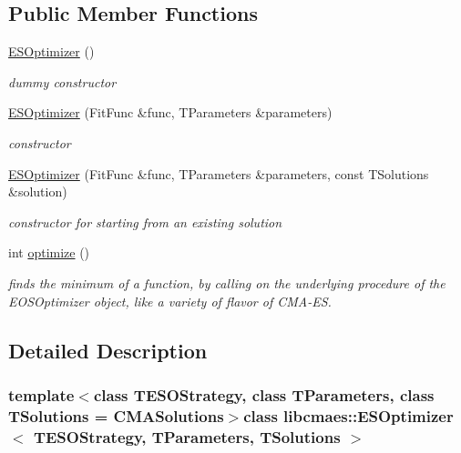 \subsection*{Public Member Functions}
\begin{DoxyCompactItemize}
\item 
\hypertarget{classlibcmaes_1_1ESOptimizer_a6a2cdd5a168a2ffb8ce0689d16c364e6}{\hyperlink{classlibcmaes_1_1ESOptimizer_a6a2cdd5a168a2ffb8ce0689d16c364e6}{E\-S\-Optimizer} ()}\label{classlibcmaes_1_1ESOptimizer_a6a2cdd5a168a2ffb8ce0689d16c364e6}

\begin{DoxyCompactList}\small\item\em dummy constructor \end{DoxyCompactList}\item 
\hyperlink{classlibcmaes_1_1ESOptimizer_a72c6ef297e29b6f85a410dbbdc0fa93e}{E\-S\-Optimizer} (Fit\-Func \&func, T\-Parameters \&parameters)
\begin{DoxyCompactList}\small\item\em constructor \end{DoxyCompactList}\item 
\hyperlink{classlibcmaes_1_1ESOptimizer_aab16f590ab683f4c4dd6f618c5e831a9}{E\-S\-Optimizer} (Fit\-Func \&func, T\-Parameters \&parameters, const T\-Solutions \&solution)
\begin{DoxyCompactList}\small\item\em constructor for starting from an existing solution \end{DoxyCompactList}\item 
\hypertarget{classlibcmaes_1_1ESOptimizer_ad14d01c88f05a536d18be2277766a715}{int \hyperlink{classlibcmaes_1_1ESOptimizer_ad14d01c88f05a536d18be2277766a715}{optimize} ()}\label{classlibcmaes_1_1ESOptimizer_ad14d01c88f05a536d18be2277766a715}

\begin{DoxyCompactList}\small\item\em finds the minimum of a function, by calling on the underlying procedure of the E\-O\-S\-Optimizer object, like a variety of flavor of C\-M\-A-\/\-E\-S. \end{DoxyCompactList}\end{DoxyCompactItemize}


\subsection{Detailed Description}
\subsubsection*{template$<$class T\-E\-S\-O\-Strategy, class T\-Parameters, class T\-Solutions = C\-M\-A\-Solutions$>$class libcmaes\-::\-E\-S\-Optimizer$<$ T\-E\-S\-O\-Strategy, T\-Parameters, T\-Solutions $>$}


